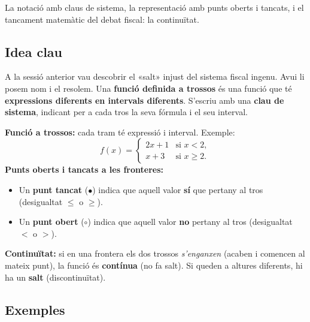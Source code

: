 %
{La notació amb claus de sistema, la representació amb punts oberts i tancats, i el tancament matemàtic del debat fiscal: la continuïtat.}

\subsection{Idea clau}

A la sessió anterior vau descobrir el «salt» injust del sistema fiscal ingenu. Avui
li posem nom i el resolem. Una \textbf{funció definida a trossos} és una funció que
té \textbf{expressions diferents en intervals diferents}. S'escriu amb una
\textbf{clau de sistema}, indicant per a cada tros la seva fórmula i el seu interval.

\begin{idea}
\textbf{Funció a trossos:} cada tram té expressió i interval. Exemple:
\[
f(x)=
\begin{cases}
2x+1 & \text{si } x<2,\\[2pt]
x+3 & \text{si } x\ge 2.
\end{cases}
\]
\textbf{Punts oberts i tancats a les fronteres:}
\begin{itemize}[leftmargin=1.4em, itemsep=2pt]
  \item Un \textbf{punt tancat} ($\bullet$) indica que aquell valor \textbf{sí} que
        pertany al tros (desigualtat $\le$ o $\ge$).
  \item Un \textbf{punt obert} ($\circ$) indica que aquell valor \textbf{no} pertany
        al tros (desigualtat $<$ o $>$).
\end{itemize}
\textbf{Continuïtat:} si en una frontera els dos trossos \emph{s'enganxen} (acaben i
comencen al mateix punt), la funció és \textbf{contínua} (no fa salt). Si queden a
altures diferents, hi ha un \textbf{salt} (discontinuïtat).
\end{idea}

\subsection{Exemples}


